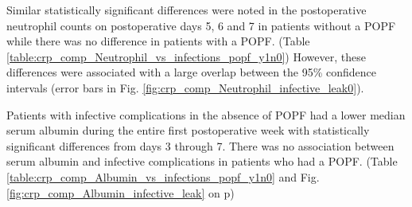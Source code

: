 Similar statistically significant differences were noted in the postoperative neutrophil counts on postoperative days 5, 6 and 7 in patients without a POPF while there was no difference in patients with a POPF. (Table \ref{table:crp_comp_Neutrophil_vs_infections_popf_y1n0})	However, these differences were associated with a large overlap between the 95\% confidence intervals (error bars in Fig. \ref{fig:crp_comp_Neutrophil_infective_leak0}).

Patients with infective complications in the absence of POPF had a lower median serum albumin  during the entire first postoperative week with statistically significant differences from days 3 through 7. 
There was no association between serum albumin and infective complications in patients who had a POPF. (Table \ref{table:crp_comp_Albumin_vs_infections_popf_y1n0} and Fig. \ref{fig:crp_comp_Albumin_infective_leak} on p\pageref{fig:crp_comp_Albumin_infective_leak})

